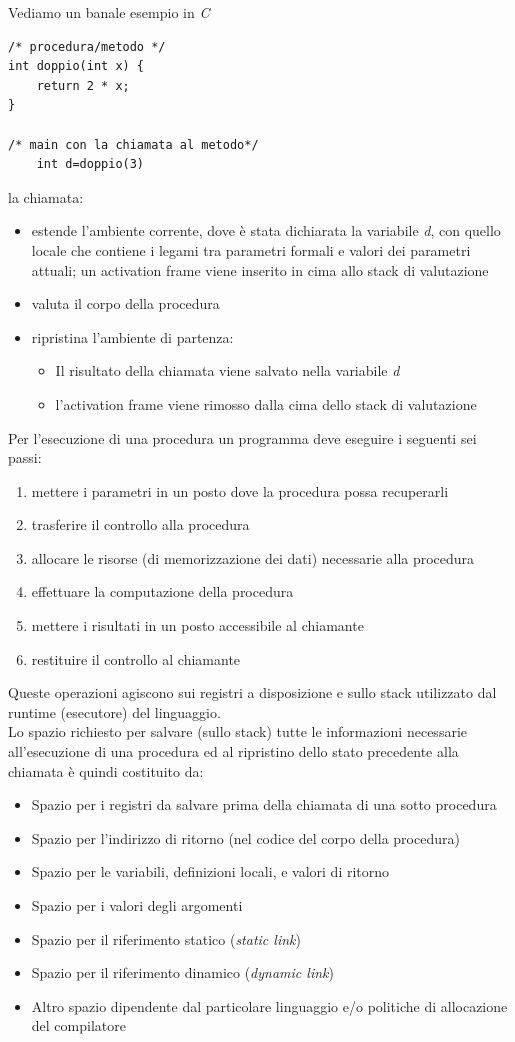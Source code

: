 \documentclass[a4paper,12pt, oneside]{book}
\begin{document}
\begin{esempio}
Vediamo un banale esempio in \textit{C}
\begin{verbatim}
/* procedura/metodo */
int doppio(int x) { 
	return 2 * x; 
}

/* main con la chiamata al metodo*/
	int d=doppio(3)
\end{verbatim}
la chiamata:
\begin{itemize}
\item estende l’ambiente corrente, dove è stata dichiarata la variabile \textit{d}, con quello locale che contiene i legami tra parametri formali e valori dei parametri attuali; un activation frame viene inserito in cima allo stack di valutazione
\item valuta il corpo della procedura
\item ripristina l'ambiente di partenza:
\begin{itemize}
\item Il risultato della chiamata viene salvato nella variabile \textit{d}
\item l’activation frame viene rimosso dalla cima dello stack di valutazione
\end{itemize}
\end{itemize}
\end{esempio}
Per l'esecuzione di una procedura un programma deve eseguire i seguenti sei passi:
\begin{enumerate}
\item mettere i parametri in un posto dove la procedura possa recuperarli
\item trasferire il controllo alla procedura
\item allocare le risorse (di memorizzazione dei dati) necessarie alla procedura
\item effettuare la computazione della procedura
\item mettere i risultati in un posto accessibile al chiamante
\item restituire il controllo al chiamante
\end{enumerate}
Queste operazioni agiscono sui registri a disposizione e sullo stack utilizzato dal runtime (esecutore) del linguaggio.\\
Lo spazio richiesto per salvare (sullo stack) tutte le informazioni necessarie all'esecuzione di una procedura ed al ripristino dello stato precedente alla chiamata è quindi costituito da:
\begin{itemize}
\item Spazio per i registri da salvare prima della chiamata di una sotto procedura
\item Spazio per l'indirizzo di ritorno (nel codice del corpo della procedura)
\item Spazio per le variabili, definizioni locali, e valori di ritorno
\item Spazio per i valori degli argomenti
\item Spazio per il riferimento statico (\textit{static link})
\item Spazio per il riferimento dinamico (\textit{dynamic link})
\item Altro spazio dipendente dal particolare linguaggio e/o politiche di allocazione del compilatore
\end{itemize}
\end{document}
